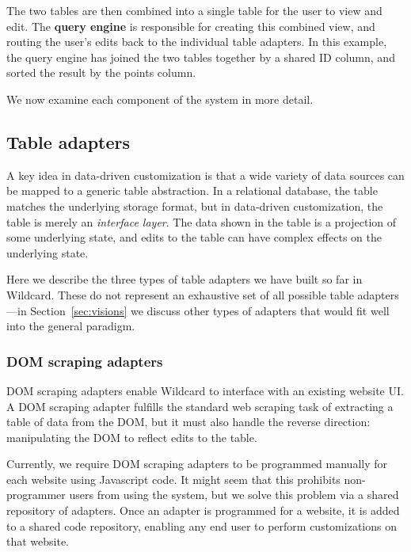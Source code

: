 \documentclass[sigplan,screen,10pt,anonymous,review]{acmart}
\begin{document}
The two tables are then combined into a single table for the user to
view and edit. The \textbf{query engine} is responsible for creating
this combined view, and routing the user's edits back to the individual
table adapters. In this example, the query engine has joined the two
tables together by a shared ID column, and sorted the result by the
points column.

We now examine each component of the system in more detail.

\hypertarget{table-adapters}{%
\subsection{Table adapters}\label{table-adapters}}

A key idea in data-driven customization is that a wide variety of data
sources can be mapped to a generic table abstraction. In a relational
database, the table matches the underlying storage format, but in
data-driven customization, the table is merely an \emph{interface
layer}. The data shown in the table is a projection of some underlying
state, and edits to the table can have complex effects on the underlying
state.

Here we describe the three types of table adapters we have built so far
in Wildcard. These do not represent an exhaustive set of all possible
table adapters---in Section~\ref{sec:visions} we discuss other types of
adapters that would fit well into the general paradigm.

\hypertarget{dom-scraping-adapters}{%
\subsubsection{DOM scraping adapters}\label{dom-scraping-adapters}}

DOM scraping adapters enable Wildcard to interface with an existing
website UI. A DOM scraping adapter fulfills the standard web scraping
task of extracting a table of data from the DOM, but it must also handle
the reverse direction: manipulating the DOM to reflect edits to the
table.

Currently, we require DOM scraping adapters to be programmed manually
for each website using Javascript code. It might seem that this
prohibits non-programmer users from using the system, but we solve this
problem via a shared repository of adapters. Once an adapter is
programmed for a website, it is added to a shared code repository,
enabling any end user to perform customizations on that website.
\end{document}
